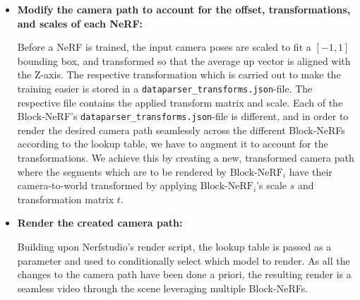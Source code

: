 \begin{itemize}
    \item \textbf{Modify the camera path to account for the offset, transformations, and scales of each NeRF:}
    
    Before a NeRF is trained, the input camera poses are scaled to fit a $[-1, 1]$ bounding box, and transformed so that the average up vector is aligned with the Z-axis. The respective transformation which is carried out to make the training easier is stored in a \texttt{dataparser\_transforms.json}-file. The respective file contains the applied transform matrix and scale. Each of the Block-NeRF's \texttt{dataparser\_transforms.json}-file is different, and in order to render the desired camera path seamlessly across the different Block-NeRFs according to the lookup table, we have to augment it to account for the transformations. We achieve this by creating a new, transformed camera path where the segments which are to be rendered by $\text{Block-NeRF}_i$ have their camera-to-world transformed by applying $\text{Block-NeRF}_i$'s scale $s$ and transformation matrix $t$. 
    
    \item \textbf{Render the created camera path:}

    Building upon Nerfstudio's render script, the lookup table is passed as a parameter and used to conditionally select which model to render. As all the changes to the camera path have been done a priori, the resulting render is a seamless video through the scene leveraging multiple Block-NeRFs.
\end{itemize}



